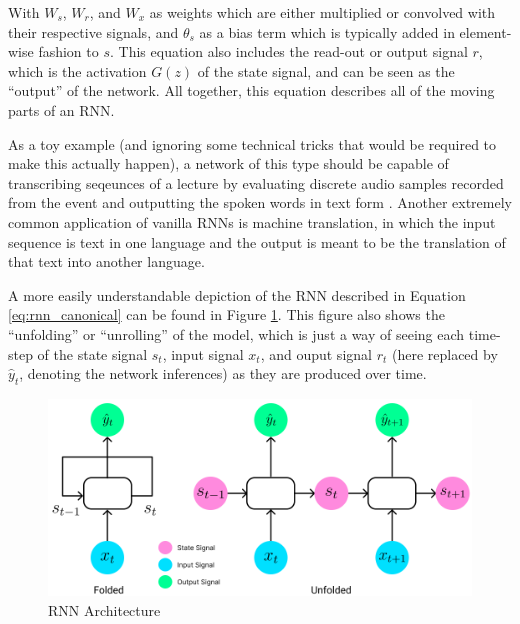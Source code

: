 \documentclass{scrartcl}
\begin{document}
With $W_s$, $W_r$, and $W_x$ as weights which are either multiplied or
convolved with their respective signals, and $\theta_s$ as a bias term
which is typically added in element-wise fashion to $s$. This equation
also includes the read-out or output signal $r$, which is the activation
$G(z)$ of the state signal, and can be seen as the ``output'' of the network.
All together, this equation describes all of the moving parts of an RNN.

As a toy example (and ignoring some technical tricks that would be required to
make this actually happen), a network of this type should be capable of
transcribing seqeunces of a lecture by evaluating discrete audio samples
recorded from the event and outputting the spoken words in text form
\cite{rnn_and_lstm_fundamentals}. Another extremely common application of
vanilla RNNs is machine translation, in which the input sequence is text in one
language and the output is meant to be the translation of that text into
another language.

A more easily understandable depiction of the RNN described in Equation
\ref{eq:rnn_canonical} can be found in Figure \ref{fig:rnn_arch}. This figure
also shows the ``unfolding'' or ``unrolling'' of the model, which is just a way
of seeing each time-step of the state signal $s_t$, input signal $x_t$, and
ouput signal $r_t$ (here replaced by $\hat{y}_t$, denoting the network
inferences) as they are produced over time.

\begin{figure}[H]
	\begin{center}
		\includegraphics[width=1\textwidth]{figures/rnn_arch.png}
	\end{center}
	\caption{RNN Architecture}
	\label{fig:rnn_arch}
\end{figure}
\end{document}
